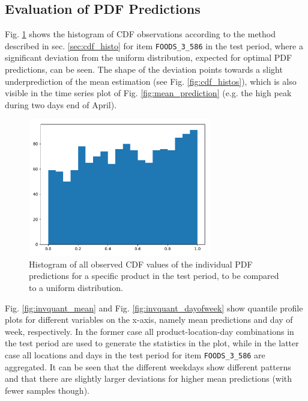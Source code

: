 \documentclass[BCOR=1mm, DIV=calc,10pt,
twoside=true,
twocolumn,
headings=normal]{scrartcl}
\newcommand{\fig}{Fig. }
\begin{document}
\subsection{Evaluation of PDF Predictions}

\fig \ref{fig:cdf_demand} shows the histogram of CDF observations according to the method described in sec. \ref{sec:cdf_histo} for item \texttt{FOODS\_3\_586} in the test period, where a significant deviation from the uniform distribution, expected for optimal PDF predictions, can be seen. The shape of the deviation points towards a slight underprediction of the mean estimation (see \fig \ref{fig:cdf_histos}), which is also visible in the time series plot of \fig \ref{fig:mean_prediction} (e.g. the high peak during two days end of April).

\begin{figure}
\begin{center}
\includegraphics[width=8cm]{../figures/cdf_truth}
\caption{\label{fig:cdf_demand} Histogram of all observed CDF values of the individual PDF predictions for a specific product in the test period, to be compared to a uniform distribution.}
\end{center}
\end{figure}

\fig \ref{fig:invquant_mean} and \fig \ref{fig:invquant_dayofweek} show quantile profile plots for different variables on the x-axis, namely mean predictions and day of week, respectively. In the former case all product-location-day combinations in the test period are used to generate the statistics in the plot, while in the latter case all locations and days in the test period for item \texttt{FOODS\_3\_586} are aggregated. It can be seen that the different weekdays show different patterns and that there are slightly larger deviations for higher mean predictions (with fewer samples though).
\end{document}
